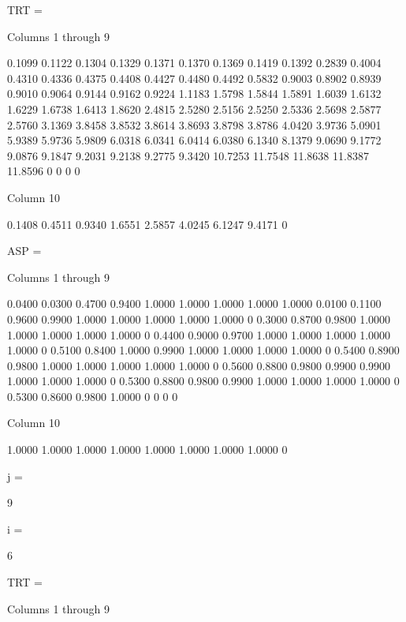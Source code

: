TRT =

  Columns 1 through 9

    0.1099    0.1122    0.1304    0.1329    0.1371    0.1370    0.1369    0.1419    0.1392
    0.2839    0.4004    0.4310    0.4336    0.4375    0.4408    0.4427    0.4480    0.4492
    0.5832    0.9003    0.8902    0.8939    0.9010    0.9064    0.9144    0.9162    0.9224
    1.1183    1.5798    1.5844    1.5891    1.6039    1.6132    1.6229    1.6738    1.6413
    1.8620    2.4815    2.5280    2.5156    2.5250    2.5336    2.5698    2.5877    2.5760
    3.1369    3.8458    3.8532    3.8614    3.8693    3.8798    3.8786    4.0420    3.9736
    5.0901    5.9389    5.9736    5.9809    6.0318    6.0341    6.0414    6.0380    6.1340
    8.1379    9.0690    9.1772    9.0876    9.1847    9.2031    9.2138    9.2775    9.3420
   10.7253   11.7548   11.8638   11.8387   11.8596         0         0         0         0

  Column 10

    0.1408
    0.4511
    0.9340
    1.6551
    2.5857
    4.0245
    6.1247
    9.4171
         0


ASP =

  Columns 1 through 9

    0.0400    0.0300    0.4700    0.9400    1.0000    1.0000    1.0000    1.0000    1.0000
    0.0100    0.1100    0.9600    0.9900    1.0000    1.0000    1.0000    1.0000    1.0000
         0    0.3000    0.8700    0.9800    1.0000    1.0000    1.0000    1.0000    1.0000
         0    0.4400    0.9000    0.9700    1.0000    1.0000    1.0000    1.0000    1.0000
         0    0.5100    0.8400    1.0000    0.9900    1.0000    1.0000    1.0000    1.0000
         0    0.5400    0.8900    0.9800    1.0000    1.0000    1.0000    1.0000    1.0000
         0    0.5600    0.8800    0.9800    0.9900    0.9900    1.0000    1.0000    1.0000
         0    0.5300    0.8800    0.9800    0.9900    1.0000    1.0000    1.0000    1.0000
         0    0.5300    0.8600    0.9800    1.0000         0         0         0         0

  Column 10

    1.0000
    1.0000
    1.0000
    1.0000
    1.0000
    1.0000
    1.0000
    1.0000
         0


j =

     9


i =

     6


TRT =

  Columns 1 through 9

